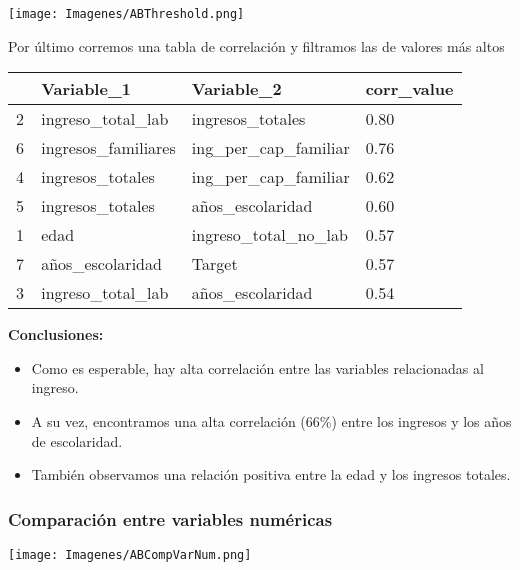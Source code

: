\documentclass[a4paper]{article}
\begin{document}
        \begin{center}
            \texttt{[image: Imagenes/ABThreshold.png]}
        \end{center}
 
        Por último corremos una tabla de correlación y filtramos las de valores más altos
 
        \begin{table}[H]
            \centering
            \begin{tabular}{|l|l|l|l|}
            \hline
                ~ & Variable\_1 & Variable\_2 & corr\_value \\ \hline
                2 & ingreso\_total\_lab & ingresos\_totales & 0.80 \\ \hline
                6 & ingresos\_familiares & ing\_per\_cap\_familiar & 0.76 \\ \hline
                4 & ingresos\_totales & ing\_per\_cap\_familiar & 0.62 \\ \hline
                5 & ingresos\_totales & años\_escolaridad & 0.60 \\ \hline
                1 & edad & ingreso\_total\_no\_lab & 0.57 \\ \hline
                7 & años\_escolaridad & Target & 0.57 \\ \hline
                3 & ingreso\_total\_lab & años\_escolaridad & 0.54 \\ \hline
            \end{tabular}
        \end{table}
 
        \textbf{Conclusiones:}
        \begin{itemize}
            \item Como es esperable, hay alta correlación entre las variables relacionadas al ingreso.
            \item A su vez, encontramos una alta correlación (66\%) entre los ingresos y los años de escolaridad.
            \item También observamos una relación positiva entre la edad y los ingresos totales.
        \end{itemize}
 
        \subsubsection{Comparación entre variables numéricas}
 
            \begin{center}
                \texttt{[image: Imagenes/ABCompVarNum.png]}
            \end{center}
 
\end{document}
